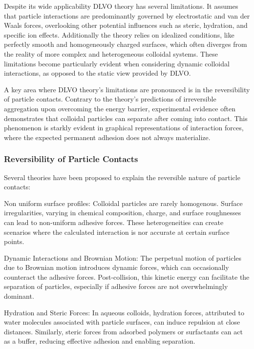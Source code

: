 Despite its wide applicability DLVO theory has several limitations. It assumes that particle interactions are predominantly governed by electrostatic and van der Waals forces, overlooking other potential influences such as steric, hydration, and specific ion effects. Additionally the theory relies on idealized conditions, like perfectly smooth and homogeneously charged surfaces, which often diverges from the reality of more complex and heterogeneous colloidal systems. These limitations become particularly evident when considering dynamic colloidal interactions, as opposed to the static view provided by DLVO.

A key area where DLVO theory's limitations are pronounced is in the reversibility of particle contacts. Contrary to the theory's predictions of irreversible aggregation upon overcoming the energy barrier, experimental evidence often demonstrates that colloidal particles can separate after coming into contact. \cite{?} This phenomenon is starkly evident in graphical representations of interaction forces, where the expected permanent adhesion does not always materialize.

\subsubsection{Reversibility of Particle Contacts}

Several theories have been proposed to explain the reversible nature of particle contacts:

Non uniform surface profiles: Colloidal particles are rarely homogenous. Surface irregularities, varying in chemical composition, charge, and surface roughnesses can lead to non-uniform adhesive forces. These heterogeneities can create scenarios where the calculated interaction is nor accurate at certain surface points.

Dynamic Interactions and Brownian Motion: The perpetual motion of particles due to Brownian motion introduces dynamic forces, which can occasionally counteract the adhesive forces. Post-collision, this kinetic energy can facilitate the separation of particles, especially if adhesive forces are not overwhelmingly dominant.

Hydration and Steric Forces: In aqueous colloids, hydration forces, attributed to water molecules associated with particle surfaces, can induce repulsion at close distances. Similarly, steric forces from adsorbed polymers or surfactants can act as a buffer, reducing effective adhesion and enabling separation.


